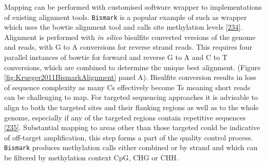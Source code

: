 \documentclass[
]{book}
\begin{document}
Mapping can be performed with customised software wrapper to implementations of existing alignment tools.
\texttt{Bismark} is a popular example of such as wrapper which uses the bowtie alignment tool and calls site methylation levels {[}\protect\hyperlink{ref-Tran2014}{234}{]}.
Alignment is performed with \emph{in silico} bisulfite converted versions of the genome and reads, with G to A conversions for reverse strand reads.
This requires four parallel instances of bowtie for forward and reverse G to A and C to T conversions, which are combined to determine the unique best alignment.
(Figure \ref{fig:Krueger2011BismarkAlignment} panel A).
Bisulfite conversion results in loss of sequence complexity as many Cs effectively become Ts meaning short reads can be challenging to map.
For targeted sequencing approaches it is advisable to align to both the targeted sites and their flanking regions as well as to the whole genome, especially if any of the targeted regions contain repetitive sequences {[}\protect\hyperlink{ref-Bottcher2012}{235}{]}.
Substantial mapping to areas other than those targeted could be indicative of off-target amplification, this step forms a part of the quality control process.
\texttt{Bismark} produces methylation calls either combined or by strand and which can be filtered by methylation context CpG, CHG or CHH.
\end{document}
